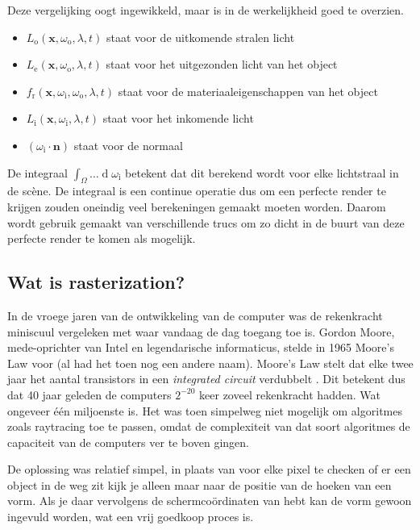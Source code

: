 \documentclass[12pt, a4paper]{article}
\begin{document}
Deze vergelijking oogt ingewikkeld, maar is in de werkelijkheid goed te overzien. 
\begin{itemize}
	\item $L_{\text{o}}(\mathbf x, \omega_{\text{o}}, \lambda, t)$ staat voor de uitkomende stralen licht
	\item $L_{\text{e}}(\mathbf x, \omega_{\text{o}}, \lambda, t)$ staat voor het uitgezonden licht van het object
	\item $	f_{\text{r}}(\mathbf x, \omega_{\text{i}}, \omega_{\text{o}}, \lambda, t)$ staat voor de materiaaleigenschappen van het object
	\item $L_{\text{i}}(\mathbf x, \omega_{\text{i}}, \lambda, t)$ staat voor het inkomende licht
	\item $(\omega_{\text{i}}\cdot\mathbf n)$ staat voor de normaal
\end{itemize}

De integraal $\int_\Omega \dots \operatorname d\omega_{\text{i}}$ betekent dat dit berekend wordt voor elke lichtstraal in de scène. De integraal is een continue operatie dus om een perfecte render te krijgen zouden oneindig veel berekeningen gemaakt moeten worden. Daarom wordt gebruik gemaakt van verschillende trucs om zo dicht in de buurt van deze perfecte render te komen als mogelijk.

\subsection{Wat is rasterization?}
In de vroege jaren van de ontwikkeling van de computer was de rekenkracht miniscuul vergeleken met waar vandaag de dag toegang toe is. Gordon Moore, mede-oprichter van Intel en legendarische informaticus, stelde in 1965 Moore's Law voor (al had het toen nog een andere naam). Moore's Law stelt dat elke twee jaar het aantal transistors in een \emph{integrated circuit} verdubbelt \cite{CrammingComponents}. Dit betekent dus dat 40 jaar geleden de computers \(2^{-20}\) keer zoveel rekenkracht hadden. Wat ongeveer één miljoenste is. Het was toen simpelweg niet mogelijk om algoritmes zoals raytracing toe te passen, omdat de complexiteit van dat soort algoritmes de capaciteit van de computers ver te boven gingen.

De oplossing was relatief simpel, in plaats van voor elke pixel te checken of er een object in de weg zit kijk je alleen maar naar de positie van de hoeken van een vorm. Als je daar vervolgens de schermcoördinaten van hebt kan de vorm gewoon ingevuld worden, wat een vrij goedkoop proces is.
\end{document}
